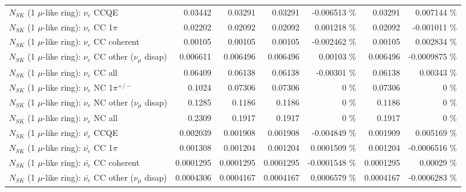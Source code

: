 \begin{table}
\begin{tabular}{| l | r | r | r  r | r  r |}
\hline
\hline
\hline
                                      $N_{SK}$ (1 $\mu$-like ring): $\nu_e$ CCQE &         0.03442 &         0.03291 &         0.03291 & -0.006513 \%  &         0.03291 & 0.007144 \%  \\ 
                                 $N_{SK}$ (1 $\mu$-like ring): $\nu_e$ CC 1$\pi$ &         0.02202 &         0.02092 &         0.02092 & 0.001218 \%  &         0.02092 & -0.001011 \%  \\ 
                               $N_{SK}$ (1 $\mu$-like ring): $\nu_e$ CC coherent &         0.00105 &         0.00105 &         0.00105 & -0.002462 \%  &         0.00105 & 0.002834 \%  \\ 
                $N_{SK}$ (1 $\mu$-like ring): $\nu_e$ CC other ($\nu_\mu$ disap) &        0.006611 &        0.006496 &        0.006496 &  0.00103 \%  &        0.006496 & -0.0009875 \%  \\ 
                                  $N_{SK}$ (1 $\mu$-like ring): $\nu_{e}$ CC all &         0.06409 &         0.06138 &         0.06138 & -0.00301 \%  &         0.06138 &  0.00343 \%  \\ 
\hline
                           $N_{SK}$ (1 $\mu$-like ring): $\nu_e$ NC 1$\pi^{+/-}$ &          0.1024 &         0.07306 &         0.07306 &        0 \%  &         0.07306 &        0 \%  \\ 
                $N_{SK}$ (1 $\mu$-like ring): $\nu_e$ NC other ($\nu_\mu$ disap) &          0.1285 &          0.1186 &          0.1186 &        0 \%  &          0.1186 &        0 \%  \\ 
                                  $N_{SK}$ (1 $\mu$-like ring): $\nu_{e}$ NC all &          0.2309 &          0.1917 &          0.1917 &        0 \%  &          0.1917 &        0 \%  \\ 
\hline
\hline
\hline
                                $N_{SK}$ (1 $\mu$-like ring): $\bar{\nu_e}$ CCQE &        0.002039 &        0.001908 &        0.001908 & -0.004849 \%  &        0.001909 & 0.005169 \%  \\ 
                           $N_{SK}$ (1 $\mu$-like ring): $\bar{\nu_e}$ CC 1$\pi$ &        0.001308 &        0.001204 &        0.001204 & 0.0001509 \%  &        0.001204 & -0.0006516 \%  \\ 
                         $N_{SK}$ (1 $\mu$-like ring): $\bar{\nu_e}$ CC coherent &       0.0001295 &       0.0001295 &       0.0001295 & -0.0001548 \%  &       0.0001295 &  0.00029 \%  \\ 
          $N_{SK}$ (1 $\mu$-like ring): $\bar{\nu_e}$ CC other ($\nu_\mu$ disap) &       0.0004306 &       0.0004167 &       0.0004167 & 0.0006579 \%  &       0.0004167 & -0.0006283 \%  \\ 

\end{tabular}
\end{table}
